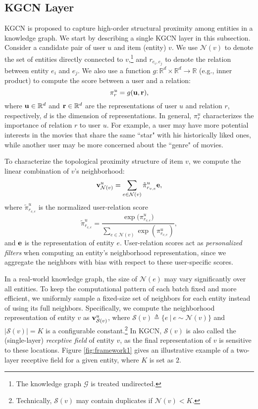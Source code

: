 \documentclass[sigconf]{acmart}
\begin{document}
	\subsection{KGCN Layer}
		KGCN is proposed to capture high-order structural proximity among entities in a knowledge graph.		
		We start by describing a single KGCN layer in this subsection.
		Consider a candidate pair of user $u$ and item (entity) $v$.
		We use $\mathcal N(v)$ to denote the set of entities directly connected to $v$,\footnote{The knowledge graph $\mathcal G$ is treated undirected.} and $r_{e_i, e_j}$ to denote the relation between entity $e_i$ and $e_j$.
		We also use a function $g: \mathbb R^d \times \mathbb R^d \rightarrow \mathbb R$ (e.g., inner product) to compute the score between a user and a relation:
		\begin{equation}
		\label{eq:ur_score}
			\pi_r^u = g({\bf u}, {\bf r}),
		\end{equation}
		where ${\bf u} \in \mathbb R^d$ and ${\bf r} \in \mathbb R^d$ are the representations of user $u$ and relation $r$, respectively, $d$ is the dimension of representations.
		In general, $\pi_r^u$ characterizes the importance of relation $r$ to user $u$.
		For example, a user may have more potential interests in the movies that share the same ``star" with his historically liked ones, while another user may be more concerned about the ``genre" of movies.
		
		To characterize the topological proximity structure of item $v$, we compute the linear combination of $v$'s neighborhood:
		\begin{equation}
		\label{eq:agg}
			{\bf v}_{\mathcal N(v)}^u = \sum_{e \in \mathcal N(v)} \tilde \pi_{r_{v, e}}^u {\bf e},
		\end{equation}
		where $\tilde \pi_{r_{v, e}}^u$ is the normalized user-relation score
		\begin{equation}
			\tilde \pi_{r_{v, e}}^u = \frac{\exp{(\pi_{r_{v, e}}^u})}{\sum_{e \in \mathcal N(v)} \exp{(\pi_{r_{v, e}}^u)}},
		\end{equation}
		and $\bf e$ is the representation of entity $e$.
		User-relation scores act as \textit{personalized filters} when computing an entity's neighborhood representation, since we aggregate the neighbors with bias with respect to these user-specific scores.
		
		In a real-world knowledge graph, the size of $\mathcal N(e)$ may vary significantly over all entities.
		To keep the computational pattern of each batch fixed and more efficient, we uniformly sample a fixed-size set of neighbors for each entity instead of using its full neighbors.
		Specifically, we compute the neighborhood representation of entity $v$ as ${\bf v}_{\mathcal S(v)}^u$, where $\mathcal S(v) \triangleq \{ e \ | \ e \sim \mathcal N(v) \}$ and $| \mathcal S(v) | = K$ is a configurable constant.\footnote{Technically, $\mathcal S(v)$ may contain duplicates if $\mathcal N(v) < K$.}
		In KGCN, $\mathcal S(v)$ is also called the (single-layer) \textit{receptive field} of entity $v$, as the final representation of $v$ is sensitive to these locations.
		Figure \ref{fig:framework1} gives an illustrative example of a two-layer receptive field for a given entity, where $K$ is set as $2$.
		
\end{document}
